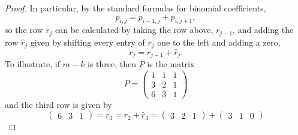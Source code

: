 \begin{proof}
  In particular, by the standard formulas for binomial coefficients,
  \[ p_{i,j} = p_{i-1,j} + p_{i,j+1}, \]
  so the row $r_{j}$ can be calculated by taking the row
  above,
  $r_{j-1}$, and adding the row $\widehat{r}_j$ given by shifting
  every entry of $r_j$ one to the left and adding a zero,
  \[ r_j = r_{j-1} + \widehat{r}_j. \]
  To illustrate, if $m-k$ is three, then $P$ is the matrix
  \[ P = 
  \begin{pmatrix}
    1 &1 & 1 \\
    3 &2 & 1 \\
    6 & 3 & 1
  \end{pmatrix} \]
  and the third row is given by
  \[
  \begin{pmatrix}
    6 &3 & 1
  \end{pmatrix} = r_3 = r_2 + \widehat{r}_3 =
  \begin{pmatrix}
    3 & 2 & 1
  \end{pmatrix} +
  \begin{pmatrix}
    3 & 1 & 0
  \end{pmatrix} \]
  

\end{proof}
